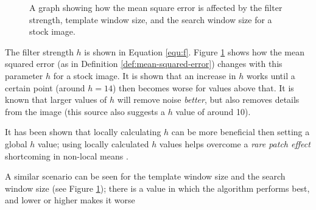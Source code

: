 \begin{figure}
    \caption{A graph showing how the mean square error is affected by the filter strength, template window size, and the search window size for a stock image.}
    \label{fig:mse}
\end{figure}

The filter strength $h$ is shown in Equation \ref{equ:f}.
Figure \ref{fig:mse} shows how the mean squared error 
(as in Definition \ref{def:mean-squared-error})
changes with this parameter $h$ for a stock image. It is shown that an increase in $h$ works
until a certain point (around $h = 14$) then becomes worse for values above that.
It is known that larger values of $h$ will remove noise \emph{better},
but also removes details from the image \cite{opencv} 
(this source also suggests a $h$ value of around 10).

It has been shown that locally calculating $h$ can be more beneficial then setting a global $h$ value;
using locally calculated $h$ values helps overcome a \emph{rare patch effect} 
shortcoming in non-local means \cite{duval2010parameter}.

A similar scenario can be seen for the template window size and the search window size
(see Figure \ref{fig:mse});
there is a value in which the algorithm performs best, and lower or higher makes it worse
